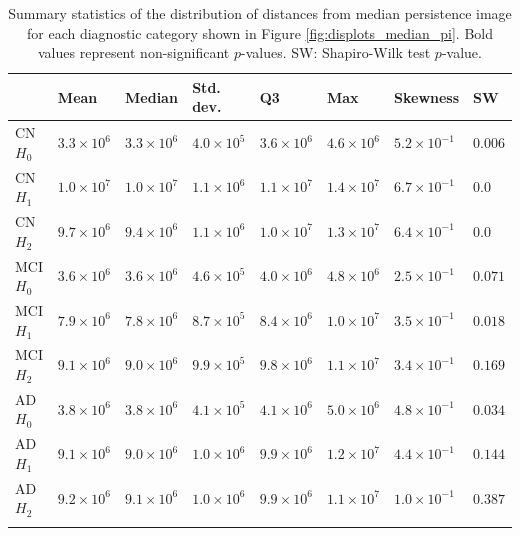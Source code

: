 \documentclass{article}
\begin{document}
\begin{table}
\centering
\begin{tabular}{llllllll}
\toprule
  {} &     Mean &   Median & Std. dev. &       Q3 &       Max & Skewness &   SW \\
\midrule
CN $H_0$  &  $3.3\times10^{6}$ &  $3.3\times10^{6}$ &  $4.0\times10^{5}$ &  $3.6\times10^{6}$ &  $4.6\times10^{6}$ &  $5.2\times10^{-1}$ &           $0.006$ \\
CN $H_1$  &  $1.0\times10^{7}$ &  $1.0\times10^{7}$ &  $1.1\times10^{6}$ &  $1.1\times10^{7}$ &  $1.4\times10^{7}$ &  $6.7\times10^{-1}$ &             $0.0$ \\
CN $H_2$  &  $9.7\times10^{6}$ &  $9.4\times10^{6}$ &  $1.1\times10^{6}$ &  $1.0\times10^{7}$ &  $1.3\times10^{7}$ &  $6.4\times10^{-1}$ &             $0.0$ \\
  MCI $H_0$ &  $3.6\times10^{6}$ &  $3.6\times10^{6}$ &  $4.6\times10^{5}$ &  $4.0\times10^{6}$ &  $4.8\times10^{6}$ &  $2.5\times10^{-1}$ &           $\mathbf{0.071}$ \\
MCI $H_1$ &  $7.9\times10^{6}$ &  $7.8\times10^{6}$ &  $8.7\times10^{5}$ &  $8.4\times10^{6}$ &  $1.0\times10^{7}$ &  $3.5\times10^{-1}$ &           $0.018$ \\
  MCI $H_2$ &  $9.1\times10^{6}$ &  $9.0\times10^{6}$ &  $9.9\times10^{5}$ &  $9.8\times10^{6}$ &  $1.1\times10^{7}$ &  $3.4\times10^{-1}$ &           $\mathbf{0.169}$ \\
AD $H_0$  &  $3.8\times10^{6}$ &  $3.8\times10^{6}$ &  $4.1\times10^{5}$ &  $4.1\times10^{6}$ &  $5.0\times10^{6}$ &  $4.8\times10^{-1}$ &           $0.034$ \\
  AD $H_1$  &  $9.1\times10^{6}$ &  $9.0\times10^{6}$ &  $1.0\times10^{6}$ &  $9.9\times10^{6}$ &  $1.2\times10^{7}$ &  $4.4\times10^{-1}$ &           $\mathbf{0.144}$ \\
AD $H_2$  &  $9.2\times10^{6}$ &  $9.1\times10^{6}$ &  $1.0\times10^{6}$ &  $9.9\times10^{6}$ &  $1.1\times10^{7}$ &  $1.0\times10^{-1}$ &           $\mathbf{0.387}$ \\
  \bottomrule
  \vspace{1pt}
\end{tabular}
\caption{Summary statistics of the distribution of distances from median persistence image for each
diagnostic category shown in Figure \ref{fig:displots_median_pi}. Bold values represent
non-significant $p$-values. SW: Shapiro-Wilk test $p$-value.}
\label{tab:stats_median_pi}
\end{table}
\end{document}
